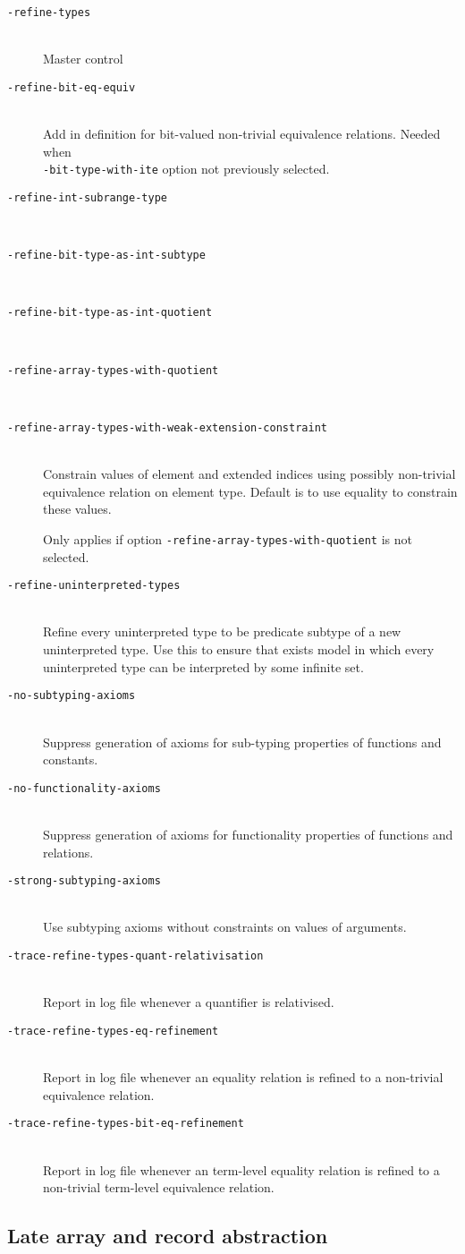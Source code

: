 \documentclass[12pt,fleqn]{article}
\newcommand{\optionb}[1]{\item[\texttt{-{#1}}]\ \\}
\begin{document}
\begin{description}
\optionb{refine-types} Master control

\optionb{refine-bit-eq-equiv} 
  Add in definition for bit-valued non-trivial equivalence relations.
  Needed when \\ \texttt{-bit-type-with-ite} option not previously selected.

\optionb{refine-int-subrange-type}       
\optionb{refine-bit-type-as-int-subtype}
\optionb{refine-bit-type-as-int-quotient}
\optionb{refine-array-types-with-quotient}

\optionb{refine-array-types-with-weak-extension-constraint}
  Constrain values of element and extended indices using possibly non-trivial
  equivalence relation on element type.  Default is to use equality to
  constrain these values.

  Only applies if option \texttt{-refine-array-types-with-quotient} is not
  selected.

\optionb{refine-uninterpreted-types}
  Refine every uninterpreted type to be predicate subtype of a new 
  uninterpreted type.  Use this to ensure that exists model in which 
  every uninterpreted type can be interpreted by some infinite set.

\optionb{no-subtyping-axioms}
  Suppress generation of axioms for sub-typing properties of functions and
  constants.

\optionb{no-functionality-axioms}
  Suppress generation of axioms for functionality properties of functions and
  relations.

\optionb{strong-subtyping-axioms}
  Use subtyping axioms without constraints on values of arguments.

\optionb{trace-refine-types-quant-relativisation}
  Report in log file whenever a quantifier is relativised.

\optionb{trace-refine-types-eq-refinement}
  Report in log file whenever an equality relation is refined to a non-trivial
  equivalence relation.

\optionb{trace-refine-types-bit-eq-refinement}
  Report in log file whenever an term-level equality relation is refined to 
  a non-trivial term-level equivalence relation.
\end{description}

\subsection{Late array and record abstraction}
\label{sec:late-arr-rec-abs}
\end{document}
